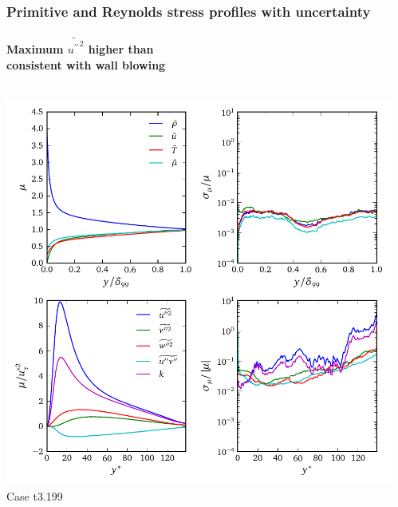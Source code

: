 \documentclass[mathserif]{beamer}
\begin{document}
\begin{frame}
    \frametitle{Primitive and Reynolds stress profiles with uncertainty}
    \framesubtitle{%
        Maximum $\widetilde{{u^{\prime\prime}}^2}$
        higher than \citet{Guarini2000Direct,Coleman1995Numerical}\\
        consistent with wall blowing~\citep{Sumitani1995Direct}
    }
    \begin{columns}
        \begin{column}{0.5\linewidth}
          \centering
          \includegraphics[width=\textwidth]{profile-t3199}
          \\
          Case t3.199
        \end{column}
        \begin{column}{0.5\linewidth}
          \centering

\end{column}
\end{columns}
\end{frame}
\end{document}
